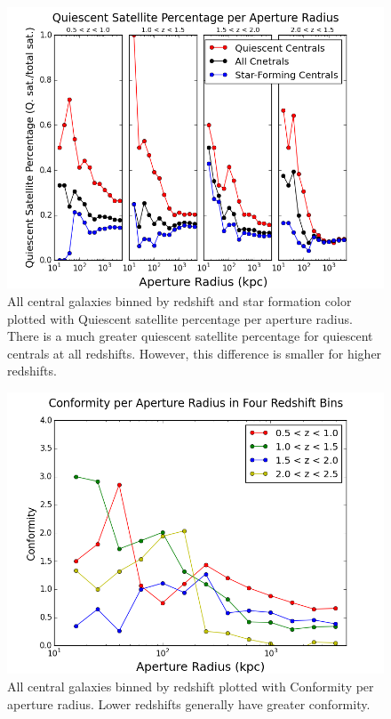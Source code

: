\documentclass[apj]{emulateapj}
\begin{document}
\begin{figure}
\centering
\graphicspath{{C:/3d_hst/2015_finals/Colors/}}
\includegraphics[width=\linewidth]{temp_color_conformity}
\caption{\footnotesize All central galaxies binned by redshift and star formation color plotted with Quiescent satellite percentage per aperture radius. There is a much greater quiescent satellite percentage for quiescent centrals at all redshifts. However, this difference is smaller for higher redshifts.}
\label{fig:conformity1}
\end{figure}

\begin{figure}
\centering
\graphicspath{{C:/3d_hst/2015_finals/Colors/}}
\includegraphics[width=\linewidth]{conformity}
\caption{\footnotesize All central galaxies binned by redshift plotted with Conformity per aperture radius. Lower redshifts generally have greater conformity.}
\label{fig:conformity2}
\end{figure}
\end{document}

